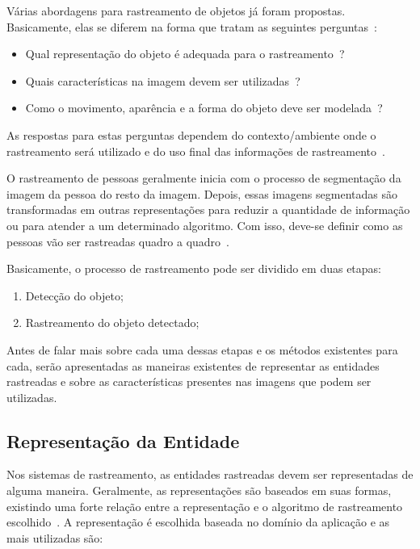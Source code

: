 	Várias abordagens para rastreamento de objetos já foram propostas. Basicamente, elas se diferem na forma que tratam as seguintes perguntas~\cite{yilmaz}: 
		
		\begin{itemize}
			\item Qual representação do objeto é adequada para o rastreamento~\cite{yilmaz}?
			\item Quais características na imagem devem ser utilizadas~\cite{yilmaz}?
			\item Como o movimento, aparência e a forma do objeto deve ser modelada~\cite{yilmaz}? 
		\end{itemize}

	As respostas para estas perguntas dependem do contexto/ambiente onde o rastreamento será utilizado e do uso final das informações de rastreamento~\cite{yilmaz}.

	O rastreamento de pessoas geralmente inicia com o processo de segmentação da
	imagem da pessoa do resto da imagem. Depois, essas imagens segmentadas são
	transformadas em outras representações para reduzir a quantidade de informação
	ou para atender a um determinado algoritmo. Com isso, deve-se definir como as
	pessoas vão ser rastreadas quadro a quadro~\cite{moeslund}.

	Basicamente, o processo de rastreamento pode ser dividido em duas etapas:

		\begin{enumerate}
			\item Detecção do objeto;
			\item Rastreamento do objeto detectado;
		\end{enumerate}

	Antes de falar mais sobre cada uma dessas etapas e os métodos existentes para cada, serão apresentadas as maneiras existentes de representar as entidades rastreadas e sobre as características presentes nas imagens que podem ser utilizadas.


\subsection{Representação da Entidade}
\label{sec:representacao-objeto}

	Nos sistemas de rastreamento, as entidades rastreadas devem ser representadas de alguma maneira. Geralmente, as representações são baseados em suas formas, existindo uma forte relação entre a representação e o algoritmo de rastreamento escolhido~\cite{yilmaz}. A representação é escolhida baseada no domínio da aplicação e as mais utilizadas são:

